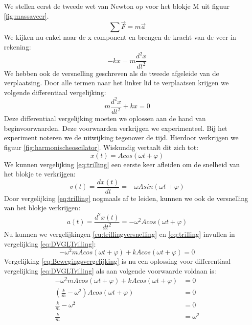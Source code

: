 \documentclass[a4paper,kul]{kulakarticle} %
\begin{document}
We stellen eerst de tweede wet van Newton op voor het blokje M uit figuur \ref{fig:massaveer}.
\begin{equation*}
	\sum \vec{F} = m\vec{a}
\end{equation*}
We kijken nu enkel naar de x-component en brengen de kracht van de veer in rekening:
\begin{equation*}
	-kx = m\frac{d^2x}{dt^2}
\end{equation*}
We hebben ook de versnelling geschreven als de tweede afgeleide van de verplaatsing. Door alle termen naar het linker lid te verplaatsen krijgen we volgende differentiaal vergelijking: 
\begin{equation}
	m\frac{d^2x}{dt^2} + kx = 0
	\label{eq:DVGLTrilling}
\end{equation}
\newpage
Deze differentiaal vergelijking moeten we oplossen aan de hand van beginvoorwaarden. Deze voorwaarden verkrijgen we experimenteel. Bij het experiment noteren we de uitwijking tegenover de tijd. Hierdoor verkrijgen we figuur \ref{fig:harmonischeoscilator}.
Wiskundig vertaalt dit zich tot: 
\begin{equation}
	x(t) = A cos(\omega t + \varphi)
	\label{eq:trilling}
\end{equation}
We kunnen vergelijking \ref{eq:trilling} een eerste keer afleiden om de snelheid van het blokje te verkrijgen: 
\begin{equation}
	v(t) = \frac{dx(t)}{dt} = -\omega Asin(\omega t + \varphi)
	\label{eq:trillingsnelheid}
\end{equation}
Door vergelijking \ref{eq:trilling} nogmaals af te leiden, kunnen we ook de versnelling van het blokje verkrijgen:
\begin{equation}
	a(t) = \frac{d^2x(t)}{dt^2} = -\omega^2 Acos(\omega t + \varphi)
	\label{eq:trillingversnelling}
\end{equation}
Nu kunnen we vergelijkingen \ref{eq:trillingversnelling} en \ref{eq:trilling} invullen in vergelijking \ref{eq:DVGLTrilling}:
\begin{equation}
	-\omega^2 mAcos(\omega t + \varphi) + k A cos(\omega t + \varphi) = 0
	\label{eq:Bewegingsvergelijking}
\end{equation}
Vergelijking \ref{eq:Bewegingsvergelijking} is nu een oplossing voor differentiaal vergelijking \ref{eq:DVGLTrilling} als aan volgende voorwaarde voldaan is:
\begin{align*}
	-\omega^2 mAcos(\omega t + \varphi) + k A cos(\omega t + \varphi) & = 0\\
	(\frac{k}{m}-\omega^2)A cos(\omega t + \varphi) & = 0\\
	\frac{k}{m}-\omega^2 & = 0\\
	\frac{k}{m} & = \omega^2
\end{align*}
\end{document}
